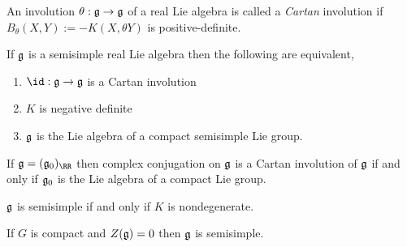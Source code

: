 \documentclass[12pt]{article}
\begin{document}
\begin{defn}
An involution $\theta : \mathfrak{g} \to \mathfrak{g}$ of a real Lie algebra is called a \textit{Cartan} involution if $B_\theta(X,Y) := -K(X, \theta Y)$ is positive-definite.
\end{defn}

\begin{prop}
If $\mathfrak{g}$ is a semisimple real Lie algebra then the following are equivalent,
\begin{enumerate}
\item $\id : \g \to \g$ is a Cartan involution
\item $K$ is negative definite
\item $\mathfrak{g}$ is the Lie algebra of a compact semisimple Lie group.
\end{enumerate}
\end{prop}

\begin{cor}
If $\g = (\g_0)_{\RR}$ then complex conjugation on $\mathfrak{g}$ is a Cartan involution of $\mathfrak{g}$ if and only if $\mathfrak{g}_0$ is the Lie algebra of a compact Lie group.
\end{cor}

\begin{theorem}[Cartan]
$\mathfrak{g}$ is semisimple if and only if $K$ is nondegenerate.
\end{theorem}

\begin{cor}
If $G$ is compact and $Z(\mathfrak{g}) = 0$ then $\mathfrak{g}$ is semisimple.
\end{cor}
\renewcommand{\t}{\mathfrak{t}}
\renewcommand{\k}{\mathfrak{k}}
\end{document}
